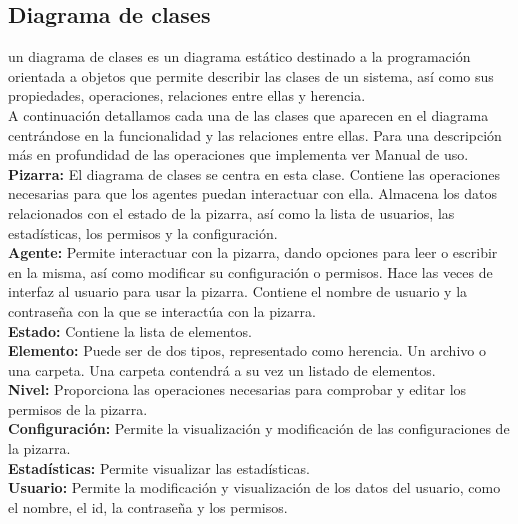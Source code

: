 \subsection{Diagrama de clases}
un diagrama de clases es un diagrama estático destinado a la programación orientada a objetos que permite describir las clases de un sistema, así como sus propiedades, operaciones, relaciones entre ellas y herencia.\\

A continuación detallamos cada una de las clases que aparecen en el diagrama centrándose en la funcionalidad y las relaciones entre ellas. Para una descripción más en profundidad de las operaciones que implementa ver Manual de uso.\\

\textbf{Pizarra:} El diagrama de clases se centra en esta clase. Contiene las operaciones necesarias para que los agentes puedan interactuar con ella. Almacena los datos relacionados con el estado de la pizarra, así como la lista de usuarios, las estadísticas, los permisos y la configuración.\\

\textbf{Agente:} Permite interactuar con la pizarra, dando opciones para leer o escribir en la misma, así como modificar su configuración o permisos. Hace las veces de interfaz al usuario para usar la pizarra. Contiene el nombre de usuario y la contraseña con la que se interactúa con la pizarra.\\

\textbf{Estado:} Contiene la lista de elementos.\\

\textbf{Elemento:} Puede ser de dos tipos, representado como herencia. Un archivo o una carpeta. Una carpeta contendrá a su vez un listado de elementos.\\

\textbf{Nivel: }Proporciona las operaciones necesarias para comprobar y editar los permisos de la pizarra.\\

\textbf{Configuración: }Permite la visualización y modificación de las configuraciones de la pizarra.\\

\textbf{Estadísticas: }Permite visualizar las estadísticas.\\

\textbf{Usuario:} Permite la modificación y visualización de los datos del usuario, como el nombre, el id, la contraseña y los permisos.


